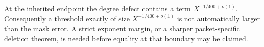 At the inherited endpoint the degree defect contains a term
\(X^{-1/400+o(1)}\).  Consequently a threshold exactly of size
\(X^{-1/400+o(1)}\) is not automatically larger than the mask error.  A
strict exponent margin, or a sharper packet-specific deletion theorem, is
needed before equality at that boundary may be claimed.
